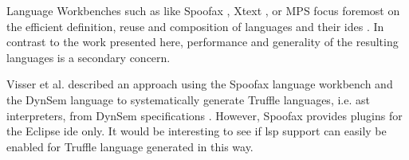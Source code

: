 \documentclass[sigplan,10pt,review,anonymous]{acmart}
\begin{document}
Language Workbenches such as like Spoofax \cite{kats2010spoofax}, Xtext
\cite{eysholdt2010xtext}, or MPS \cite{voelter2012language} focus foremost on
the efficient definition, reuse and composition of languages and their
\acp{ide} \cite{erdweg2013state}. In contrast to the work presented here,
performance and generality of the resulting languages is a secondary concern.



Visser et al. described an approach using the Spoofax language workbench
\cite{kats2010spoofax} and the DynSem language
\cite{vergu_et_al:LIPIcs:2015:5208} to systematically generate Truffle
languages, i.e. \ac{ast} interpreters, from DynSem specifications
\cite{visser2014language}. However, Spoofax provides plugins for the Eclipse
\ac{ide} only. It would be interesting to see if \ac{lsp} support can easily be
enabled for Truffle language generated in this way.
\end{document}

